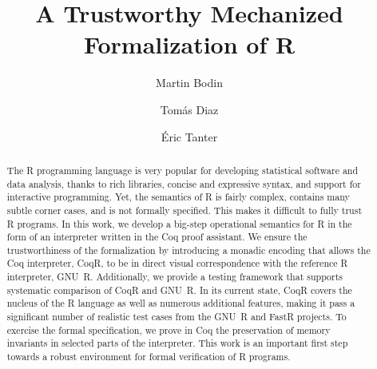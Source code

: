 \documentclass[
    sigplan,
    10pt,
    review, %
    natbib=false %
 ]{acmart}
\newcommand\CoqR{CoqR}
\begin{document}
\title{A Trustworthy Mechanized Formalization of R}

\author{Martin Bodin}

\author{Tom{\'a}s Diaz}

\author{{\'E}ric Tanter}

\begin{abstract}
The R programming language is very popular for developing statistical software and data analysis, thanks to rich libraries, concise and expressive syntax, and support for interactive programming. Yet, the semantics of R is fairly complex, contains many subtle corner cases, and is not formally specified. This makes it difficult to fully trust R programs. In this work, we develop a big-step operational semantics for R in the form of an interpreter written in the Coq proof assistant. We ensure the trustworthiness of the formalization by introducing a monadic encoding that allows the Coq interpreter, \CoqR, to be in direct visual correspondence with the reference R interpreter, GNU~R. Additionally, we provide a testing framework that supports systematic comparison of \CoqR{} and GNU~R. In its current state, \CoqR{} covers the nucleus of the R language as well as numerous additional features, making it pass a significant number of realistic test cases from the GNU~R and FastR projects. To exercise the formal specification, we prove in Coq the preservation of memory invariants in selected parts of the interpreter. This work is an important first step towards a robust environment for
formal verification of R programs.
\end{abstract}
\end{document}
